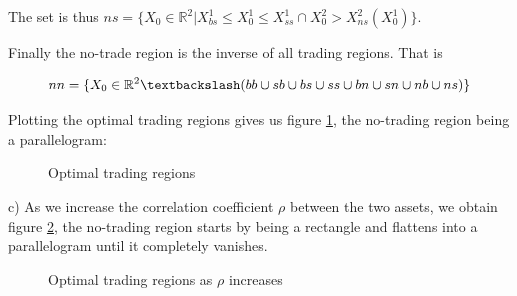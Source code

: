 \documentclass[10pt]{article}
\begin{document}
The set is thus $ns = \{ X_0 \in \mathbb{R}^2 \vert X_{bs}^1 \leq X_0^1 \leq X_{ss}^1 \cap X_0^2 > X_{ns}^2(X_0^1) \}$.

\bigbreak

Finally the no-trade region is the inverse of all trading regions. That is 

\begin{align*}
	nn = \{ X_0 \in \mathbb{R}^2 \textbackslash (bb \cup sb \cup bs \cup ss \cup bn \cup sn \cup nb \cup ns) \}
\end{align*}

Plotting the optimal trading regions gives us figure \ref{ex2_1}, the no-trading region being a parallelogram: 

\begin{figure}[h]
    \centering
    \caption{Optimal trading regions}
    \label{ex2_1}    
\end{figure}

\bigbreak

c) As we increase the correlation coefficient $\rho$ between the two assets, we obtain figure \ref{ex2_2}, the no-trading region starts by being a rectangle and flattens into a parallelogram until it completely vanishes.

\begin{figure}[h]
    \centering
    \caption{Optimal trading regions as $\rho$ increases}
    \label{ex2_2}    
\end{figure}
\end{document}
